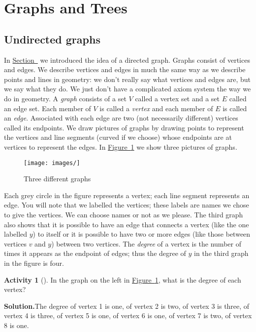 \documentclass[10pt,]{book}
\theoremstyle{plain}
\theoremstyle{definition}
\newtheorem{activity}[project]{Activity}
\numberwithin{equation}{chapter}
\begin{document}
\section[{Graphs and Trees}]{Graphs and Trees}\label{sec_induction-graphstrees}
\typeout{************************************************}
\typeout{************************************************}
\subsection[{Undirected graphs}]{Undirected graphs}\label{graphsection}
In \hyperref[Ramseysection]{Section~} we introduced the idea of a directed graph. Graphs consist of vertices and edges. We describe vertices and edges in much the same way as we describe points and lines in geometry: we don't really say what vertices and edges are, but we say what they do. We just don't have a complicated axiom system the way we do in geometry. A \emph{graph} consists of a set \(V\) called a vertex set and a set \(E\) called an edge set. Each member of \(V\) is called a \emph{vertex} and each member of \(E\) is called an \emph{edge}. Associated with each edge are two (not necessarily different) vertices called its endpoints. We draw pictures of graphs by drawing points to represent the vertices and line segments (curved if we choose) whose endpoints are at vertices to represent the edges. In \hyperref[Threegraphs]{Figure~\ref{Threegraphs}} we show three pictures of graphs.%
\begin{figure}
\centering
\texttt{[image: images/]}
\caption{Three different graphs\label{Threegraphs}}
\end{figure}
Each grey circle in the figure represents a vertex; each line segment represents an edge. You will note that we labelled the vertices; these labels are names we chose to give the vertices. We can choose names or not as we please. The third graph also shows that it is possible to have an edge that connects a vertex (like the one labelled \(y\)) to itself or it is possible to have two or more edges (like those between vertices \(v\) and \(y\)) between two vertices. The \emph{degree} of a vertex is the number of times it appears as the endpoint of edges; thus the degree of \(y\) in the third graph in the figure is four.%
\begin{activity}[]\label{activity-45}
In the graph on the left in \hyperref[Threegraphs]{Figure~\ref{Threegraphs}}, what is the degree of each vertex?%
\par\medskip\noindent%
\textbf{Solution.}\quad The degree of vertex 1 is one, of vertex 2 is two, of vertex 3 is three, of vertex 4 is three, of vertex 5 is one, of vertex 6 is one, of vertex 7 is two, of vertex 8 is one.%
\end{activity}
\end{document}
